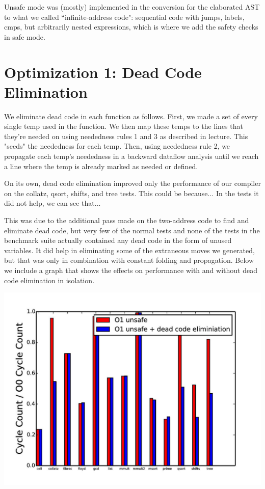 \documentclass{article}
\begin{document}
Unsafe mode was (mostly) implemented in the conversion for the elaborated AST to what we called ``infinite-address code": sequential code with jumps, labels, cmps, but arbitrarily nested expressions, which is where we add the safety checks in safe mode.

\section{Optimization 1: Dead Code Elimination}

We eliminate dead code in each function as follows. First, we made a set of every single temp used in the function. We then map these temps to the lines that they're needed on using neededness rules 1 and 3 as described in lecture. This "seeds" the neededness for each temp. Then, using neededness rule 2, we propagate each temp's neededness in a backward dataflow analysis until we reach a line where the temp is already marked as needed or defined. 

On its own, dead code elimination improved only the performance of our compiler on the collatz, qsort, shifts, and tree tests. This could be because... In the tests it did not help, we can see that...

This was due to the additional pass made on the two-address code to find and eliminate dead code, but very few of the normal tests and none of the tests in the benchmark suite actually contained any dead code in the form of unused variables. It did help in eliminating some of the extraneous moves we generated, but that was only in combination with constant folding and propagation. Below we include a graph that shows the effects on performance with and without dead code elimination in isolation.

\includegraphics[scale=0.5]{O1_vs_deadcode-page-001}
\end{document}
